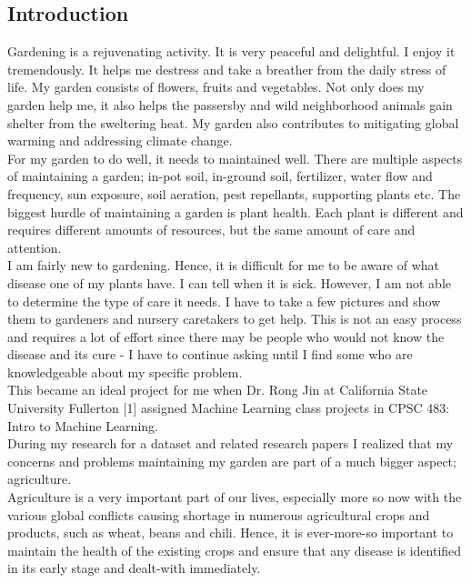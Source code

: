 \documentclass[twocolumn,10pt]{article}
\begin{document}
\begin{multicols}{2}
\begin{flushleft}
	\section{Introduction}
	Gardening is a rejuvenating activity. It is very peaceful and delightful. I enjoy it tremendously. It helps me destress and take a breather from the daily stress of life. My garden consists of flowers, fruits and vegetables. Not only does my garden help me, it also helps the passersby and wild neighborhood animals gain shelter from the sweltering heat. My garden also contributes to mitigating global warming and addressing climate change.\\
	For my garden to do well, it needs to maintained well. There are multiple aspects of maintaining a garden; in-pot soil, in-ground soil, fertilizer, water flow and frequency, sun exposure, soil aeration, pest repellants, supporting plants etc. The biggest hurdle of maintaining a garden is plant health. Each plant is different and requires different amounts of resources, but the same amount of care and attention.\\
	I am fairly new to gardening. Hence, it is difficult for me to be aware of what disease one of my plants have. I can tell when it is sick. However, I am not able to determine the type of care it needs. I have to take a few pictures and show them to gardeners and nursery caretakers to get help. This is not an easy process and requires a lot of effort since there may be people who would not know the disease and its cure - I have to continue asking until I find some who are knowledgeable about my specific problem.\\
	This became an ideal project for me when Dr. Rong Jin at California State University Fullerton [1] assigned Machine Learning class projects in CPSC 483: Intro to Machine Learning.\\
	During my research for a dataset and related research papers I realized that my concerns and problems maintaining my garden are part of a much bigger aspect; agriculture.\\
	Agriculture is a very important part of our lives, especially more so now with the various global conflicts causing shortage in numerous agricultural crops and products, such as wheat, beans and chili. Hence, it is ever-more-so important to maintain the health of the existing crops and ensure that any disease is identified in its early stage and dealt-with immediately.\\

\end{flushleft}
\end{multicols}
\end{document}
